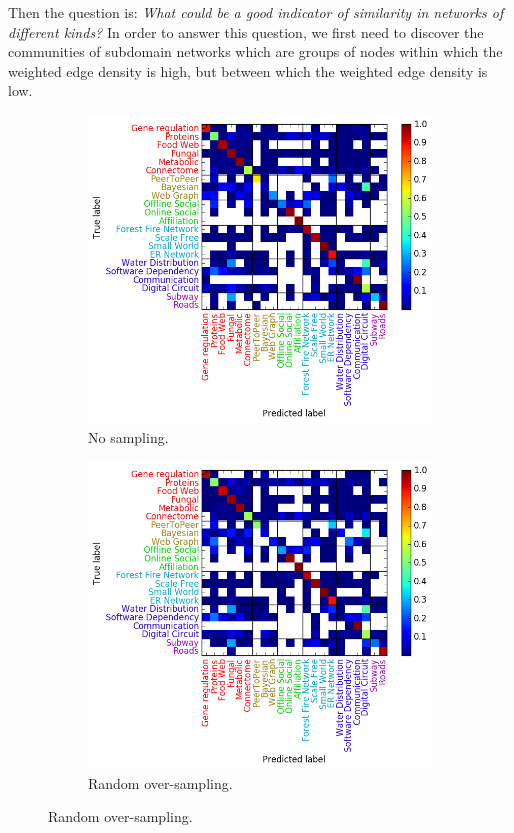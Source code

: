 \documentclass[..]{revtex4}
\begin{document}
Then the question is: \textit{What could be a good indicator of similarity in networks of different kinds?} In order to answer this question, we first need to discover the communities of subdomain networks which are groups of nodes within which the weighted edge density is high, but between which the weighted edge density is low.

\begin{figure}[H]
	\begin{subfigure}{0.48\textwidth}
	\includegraphics[width=\linewidth]{figs/similarity/SubDomain/None/confusion_sub_None.png}
	\caption{No sampling. } \label{no_confusion_sub}
	\end{subfigure}\hspace*{\fill}
	\begin{subfigure}{0.48\textwidth}
	\includegraphics[width=\linewidth]{figs/similarity/SubDomain/RandomOver/confusion_sub_RandomOver.png}
	\caption{Random over-sampling. } \label{random_over_confusion_sub}
	\end{subfigure}
	

\end{figure}
\end{document}
